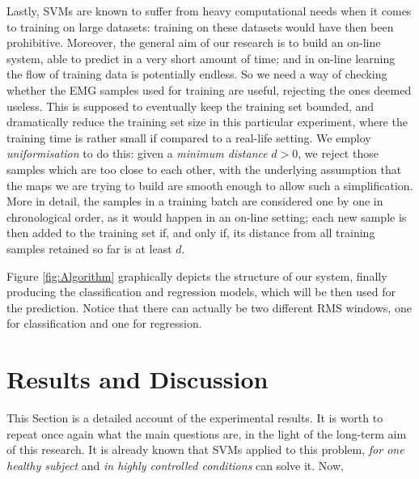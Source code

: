 \documentclass[10pt]{bmc_article}
\def\texttt{[image: ]}
\newenvironment{bmcformat}{\begin{raggedright}\baselineskip20pt\sloppy\setboolean{publ}{false}}{\end{raggedright}\baselineskip20pt\sloppy}
\begin{document}
\begin{bmcformat}
Lastly, SVMs are known to suffer from heavy computational needs when
it comes to training on large datasets: training on these datasets
would have then been prohibitive. Moreover, the general aim of our
research is to build an on-line system, able to predict in a very
short amount of time; and in on-line learning the flow of training
data is potentially endless. So we need a way of checking whether the
EMG samples used for training are useful, rejecting the ones deemed
useless. This is supposed to eventually keep the training set bounded,
and dramatically reduce the training set size in this particular
experiment, where the training time is rather small if compared to a
real-life setting. We employ \emph{uniformisation}
\cite{2008.ICRA,2008.BioCyb} to do this: given a \emph{minimum
distance} $d > 0$, we reject those samples which are too close to each
other, with the underlying assumption that the maps we are trying to
build are smooth enough to allow such a simplification. More in
detail, the samples in a training batch are considered one by one in
chronological order, as it would happen in an on-line setting; each
new sample is then added to the training set if, and only if, its
distance from all training samples retained so far is at least
$d$.


Figure \ref{fig:Algorithm} graphically depicts the structure of our
system, finally producing the classification and regression models,
which will be then used for the prediction. Notice that there can
actually be two different RMS windows, one for classification and one
for regression.

\section*{Results and Discussion}
\label{sec:exp}

This Section is a detailed account of the experimental results. It is
worth to repeat once again what the main questions are, in the light
of the long-term aim of this research. It is already known that SVMs
applied to this problem, \emph{for one healthy subject} and \emph{in
highly controlled conditions} can solve it. Now,


\end{bmcformat}
\end{document}

